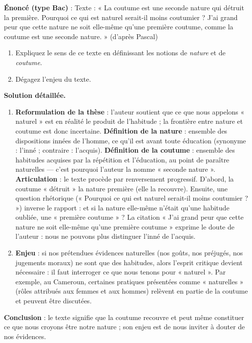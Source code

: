 \documentclass[11pt]{article}
\begin{document}
\begin{exoresolu}
\textbf{Énoncé (type Bac)} : Texte : « La coutume est une seconde nature qui détruit la première. Pourquoi ce qui est naturel serait-il moins coutumier ? J'ai grand peur que cette nature ne soit elle-même qu'une première coutume, comme la coutume est une seconde nature. » (d'après Pascal)
\begin{enumerate}
\item Expliquez le sens de ce texte en définissant les notions de \emph{nature} et de \emph{coutume}.
\item Dégagez l'enjeu du texte.
\end{enumerate}
\tcblower
\textbf{Solution détaillée.}
\begin{enumerate}
\item \textbf{Reformulation de la thèse} : l'auteur soutient que ce que nous appelons « naturel » est en réalité le produit de l'habitude ; la frontière entre nature et coutume est donc incertaine.
\textbf{Définition de la nature} : ensemble des dispositions innées de l'homme, ce qu'il est avant toute éducation (synonyme : l'inné ; contraire : l'acquis).
\textbf{Définition de la coutume} : ensemble des habitudes acquises par la répétition et l'éducation, au point de paraître naturelles — c'est pourquoi l'auteur la nomme « seconde nature ».
\textbf{Articulation} : le texte procède par renversement progressif. D'abord, la coutume « détruit » la nature première (elle la recouvre). Ensuite, une question rhétorique (« Pourquoi ce qui est naturel serait-il moins coutumier ? ») inverse le rapport : et si la nature elle-même n'était qu'une habitude oubliée, une « première coutume » ? La citation « J'ai grand peur que cette nature ne soit elle-même qu'une première coutume » exprime le doute de l'auteur : nous ne pouvons plus distinguer l'inné de l'acquis.
\item \textbf{Enjeu} : si nos prétendues évidences naturelles (nos goûts, nos préjugés, nos jugements moraux) ne sont que des habitudes, alors l'esprit critique devient nécessaire : il faut interroger ce que nous tenons pour « naturel ». Par exemple, au Cameroun, certaines pratiques présentées comme « naturelles » (rôles attribués aux femmes et aux hommes) relèvent en partie de la coutume et peuvent être discutées.
\end{enumerate}
\textbf{Conclusion} : le texte signifie que la coutume recouvre et peut même constituer ce que nous croyons être notre nature ; son enjeu est de nous inviter à douter de nos évidences.
\end{exoresolu}
\end{document}
